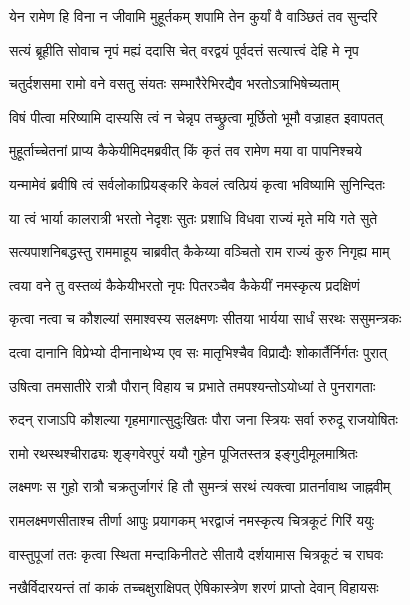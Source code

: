 \twolineshloka
{येन रामेण हि विना न जीवामि मुहूर्तकम्}
{शपामि तेन कुर्यां वै वाञ्छितं तव सुन्दरि} %

\twolineshloka
{सत्यं ब्रूहीति सोवाच नृपं मह्यं ददासि चेत्}
{वरद्वयं पूर्वदत्तं सत्यात्त्वं देहि मे नृप} %

\twolineshloka
{चतुर्दशसमा रामो वने वसतु संयतः}
{सम्भारैरेभिरद्यैव भरतोऽत्राभिषेच्यताम्} %

\twolineshloka
{विषं पीत्वा मरिष्यामि दास्यसि त्वं न चेन्नृप}
{तच्छ्रुत्वा मूर्छितो भूमौ वज्राहत इवापतत्} %

\twolineshloka
{मुहूर्ताच्चेतनां प्राप्य कैकेयीमिदमब्रवीत्}
{किं कृतं तव रामेण मया वा पापनिश्चये} %

\twolineshloka
{यन्मामेवं ब्रवीषि त्वं सर्वलोकाप्रियङ्करि}
{केवलं त्वत्प्रियं कृत्वा भविष्यामि सुनिन्दितः} %

\twolineshloka
{या त्वं भार्या कालरात्री भरतो नेदृशः सुतः}
{प्रशाधि विधवा राज्यं मृते मयि गते सुते} %

\twolineshloka
{सत्यपाशनिबद्धस्तु राममाहूय चाब्रवीत्}
{कैकेय्या वञ्चितो राम राज्यं कुरु निगृह्य माम्} %

\twolineshloka
{त्वया वने तु वस्तव्यं कैकेयीभरतो नृपः}
{पितरञ्चैव कैकेयीं नमस्कृत्य प्रदक्षिणं} %

\twolineshloka
{कृत्वा नत्वा च कौशल्यां समाश्वस्य सलक्ष्मणः}
{सीतया भार्यया सार्धं सरथः ससुमन्त्रकः} %

\twolineshloka
{दत्वा दानानि विप्रेभ्यो दीनानाथेभ्य एव सः}
{मातृभिश्चैव विप्राद्यैः शोकार्तैर्निर्गतः पुरात्} %

\twolineshloka
{उषित्वा तमसातीरे रात्रौ पौरान् विहाय च}
{प्रभाते तमपश्यन्तोऽयोध्यां ते पुनरागताः} %

\twolineshloka
{रुदन् राजाऽपि कौशल्या गृहमागात्सुदुःखितः}
{पौरा जना स्त्रियः सर्वा रुरुदू राजयोषितः} %

\twolineshloka
{रामो रथस्थश्चीराढ्यः शृङ्गवेरपुरं ययौ}
{गुहेन पूजितस्तत्र इङ्गुदीमूलमाश्रितः} %

\twolineshloka
{लक्ष्मणः स गुहो रात्रौ चक्रतुर्जागरं हि तौ}
{सुमन्त्रं सरथं त्यक्त्वा प्रातर्नावाथ जाह्नवीम्} %

\twolineshloka
{रामलक्ष्मणसीताश्च तीर्णा आपुः प्रयागकम्}
{भरद्वाजं नमस्कृत्य चित्रकूटं गिरिं ययुः} %

\twolineshloka
{वास्तुपूजां ततः कृत्वा स्थिता मन्दाकिनीतटे}
{सीतायै दर्शयामास चित्रकूटं च राघवः} %

\twolineshloka
{नखैर्विदारयन्तं तां काकं तच्चक्षुराक्षिपत्}
{ऐषिकास्त्रेण शरणं प्राप्तो देवान् विहायसः} %

